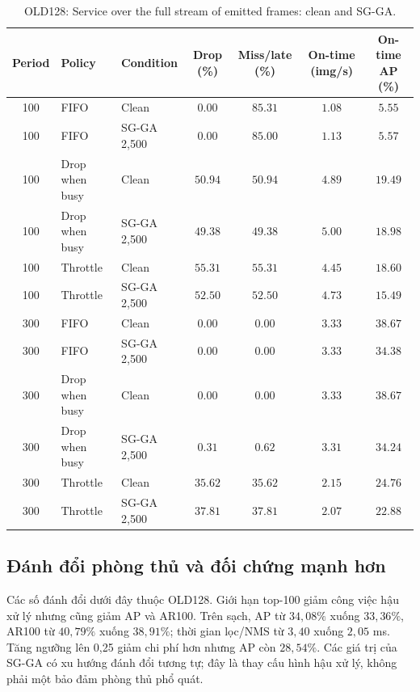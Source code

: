 \documentclass[a4paper,fleqn]{cas-dc}
\begin{document}
\begin{table}[t]
\centering
\small
\caption{OLD128: Service over the full stream of emitted frames: clean and SG-GA.}
\begin{tabularx}{\textwidth}{@{}c X X c c c c@{}}
\toprule
\textbf{Period} & \textbf{Policy} & \textbf{Condition} & \textbf{Drop (\%)} & \textbf{Miss/late (\%)} & \textbf{On-time (img/s)} & \textbf{On-time AP (\%)} \\
\midrule
100 & FIFO & Clean & $0.00$ & $85.31$ & $1.08$ & $5.55$ \\
100 & FIFO & SG-GA 2,500 & $0.00$ & $85.00$ & $1.13$ & $5.57$ \\
100 & Drop when busy & Clean & $50.94$ & $50.94$ & $4.89$ & $19.49$ \\
100 & Drop when busy & SG-GA 2,500 & $49.38$ & $49.38$ & $5.00$ & $18.98$ \\
100 & Throttle & Clean & $55.31$ & $55.31$ & $4.45$ & $18.60$ \\
100 & Throttle & SG-GA 2,500 & $52.50$ & $52.50$ & $4.73$ & $15.49$ \\
300 & FIFO & Clean & $0.00$ & $0.00$ & $3.33$ & $38.67$ \\
300 & FIFO & SG-GA 2,500 & $0.00$ & $0.00$ & $3.33$ & $34.38$ \\
300 & Drop when busy & Clean & $0.00$ & $0.00$ & $3.33$ & $38.67$ \\
300 & Drop when busy & SG-GA 2,500 & $0.31$ & $0.62$ & $3.31$ & $34.24$ \\
300 & Throttle & Clean & $35.62$ & $35.62$ & $2.15$ & $24.76$ \\
300 & Throttle & SG-GA 2,500 & $37.81$ & $37.81$ & $2.07$ & $22.88$ \\
\bottomrule
\end{tabularx}
\label{tab:stream}
\end{table}

\subsection{Đánh đổi phòng thủ và đối chứng mạnh hơn}

Các số đánh đổi dưới đây thuộc OLD128. Giới hạn top-100 giảm công việc hậu xử lý nhưng cũng giảm AP và AR100. Trên sạch, AP từ $34{,}08\%$ xuống $33{,}36\%$, AR100 từ $40{,}79\%$ xuống $38{,}91\%$; thời gian lọc/NMS từ $3{,}40$ xuống $2{,}05$ ms. Tăng ngưỡng lên 0,25 giảm chi phí hơn nhưng AP còn $28{,}54\%$. Các giá trị của SG-GA có xu hướng đánh đổi tương tự; đây là thay cấu hình hậu xử lý, không phải một bảo đảm phòng thủ phổ quát.
\end{document}
